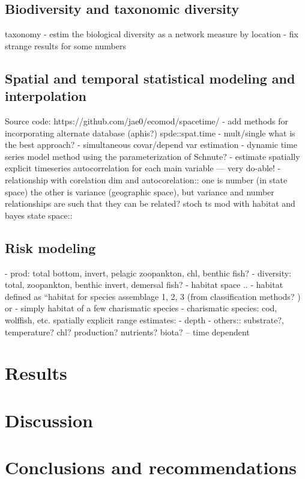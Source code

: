 \documentclass[letterpaper,portrait,11pt]{scrartcl}
\numberwithin{equation}{section}		%
\numberwithin{figure}{section}			%
\numberwithin{table}{section}				%
\begin{document}
\subsection{Biodiversity and taxonomic diversity}
taxonomy
- estim the biological diversity as a network measure by location
- fix strange results for some numbers

\subsection{Spatial and temporal statistical modeling and interpolation}
Source code: https://github.com/jae0/ecomod/spacetime/
- add methods for incorporating alternate database (aphis?)
	spde::spat.time
- mult/single what is the best approach?
- simultaneous covar/depend var estimation
- dynamic time series model method using the parameterization of Schnute?
- estimate spatially explicit timeseries autocorrelation for each main variable --- very do-able!
- relationship with corelation dim and autocorelation:: one is number (in state space) the other is variance (geographic space), but variance and number relationships are such that they can be related?
	stoch ts mod with habitat and bayes state space::

\subsection{Risk modeling}

- prod: total bottom, invert, pelagic zoopankton, chl, benthic fish?
- diversity: total, zoopankton, benthic invert, demersal fish?
- habitat space ..
- habitat defined as {``}habitat for species assemblage 1, 2, 3 (from classification methods? ) or
- simply habitat of a few charismatic species
- charismatic species: cod, wolffish, etc.
	spatially explicit range estimates:
- depth
- others:: substrate?, temperature? chl? production? nutrients? biota? -- time dependent

\section{Results}

\section{Discussion}

\section{Conclusions and recommendations}
\end{document}
